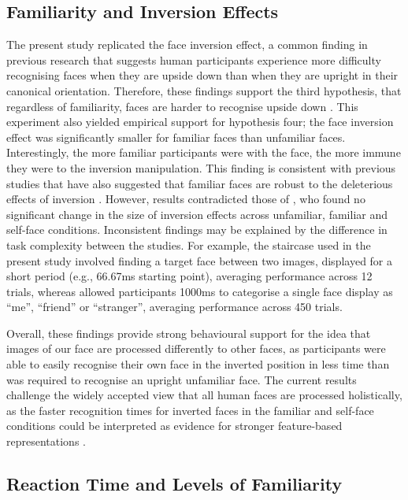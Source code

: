 \documentclass[
  authoryear,
  review,
  3p,
  onecolumn]{elsarticle}
\begin{document}
\subsection{Familiarity and Inversion
Effects}\label{familiarity-and-inversion-effects}

The present study replicated the face inversion effect, a common finding
in previous research that suggests human participants experience more
difficulty recognising faces when they are upside down than when they
are upright in their canonical orientation. Therefore, these findings
support the third hypothesis, that regardless of familiarity, faces are
harder to recognise upside down
\citep{allen-davidian2021a, kramer2018a, taubert2011a, young2017a}. This
experiment also yielded empirical support for hypothesis four; the face
inversion effect was significantly smaller for familiar faces than
unfamiliar faces. Interestingly, the more familiar participants were
with the face, the more immune they were to the inversion manipulation.
This finding is consistent with previous studies that have also
suggested that familiar faces are robust to the deleterious effects of
inversion \citep{keyes2012a, keyes2010a, yang2014a}. However, results
contradicted those of \citet{alzueta2019a}, who found no significant
change in the size of inversion effects across unfamiliar, familiar and
self-face conditions. Inconsistent findings may be explained by the
difference in task complexity between the studies. For example, the
staircase used in the present study involved finding a target face
between two images, displayed for a short period (e.g., 66.67ms starting
point), averaging performance across 12 trials, whereas
\citet{alzueta2019a} allowed participants 1000ms to categorise a single
face display as ``me'', ``friend'' or ``stranger'', averaging
performance across 450 trials.

Overall, these findings provide strong behavioural support for the idea
that images of our face are processed differently to other faces, as
participants were able to easily recognise their own face in the
inverted position in less time than was required to recognise an upright
unfamiliar face. The current results challenge the widely accepted view
that all human faces are processed holistically, as the faster
recognition times for inverted faces in the familiar and self-face
conditions could be interpreted as evidence for stronger feature-based
representations \citep{gerlach2022a, tong1999a}.

\subsection{Reaction Time and Levels of
Familiarity}\label{reaction-time-and-levels-of-familiarity}
\end{document}
